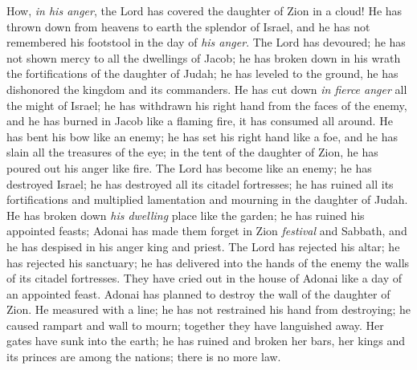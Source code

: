\begin{biblechapter} %
 How, \textit{in his anger}, 
the Lord has covered the daughter of Zion in a cloud! 
He has thrown down from heavens to earth 
the splendor of Israel, 
and he has not remembered his footstool 
in the day of \textit{his anger}.
\verse The Lord has devoured; he has not shown mercy 
to all the dwellings of Jacob; 
he has broken down in his wrath 
the fortifications of the daughter of Judah; 
he has leveled to the ground, he has dishonored 
the kingdom and its commanders.
\verse He has cut down \textit{in fierce anger} 
all the might of Israel; 
he has withdrawn his right hand 
from the faces of the enemy, 
and he has burned in Jacob like a flaming fire, 
it has consumed all around.
\verse He has bent his bow like an enemy; 
he has set his right hand 
like a foe, and he has slain 
all the treasures of the eye; 
in the tent of the daughter of Zion, 
he has poured out his anger like fire.
\verse The Lord has become like an enemy; 
he has destroyed Israel; 
he has destroyed all its citadel fortresses; 
he has ruined all its fortifications 
and multiplied lamentation and mourning 
in the daughter of Judah.
\verse He has broken down \textit{his dwelling} place like the garden; 
he has ruined his appointed feasts; 
Adonai has made them forget in Zion 
\textit{festival} and Sabbath, 
and he has despised in his anger 
king and priest.
\verse The Lord has rejected his altar; 
he has rejected his sanctuary; 
he has delivered into the hands of the enemy 
the walls of its citadel fortresses. 
They have cried out in the house of Adonai 
like a day of an appointed feast.
\verse Adonai has planned to destroy 
the wall of the daughter of Zion. 
He measured with a line; he has not restrained 
his hand from destroying; 
he caused rampart and wall to mourn; 
together they have languished away.
\verse Her gates have sunk into the earth; 
he has ruined and broken her bars, 
her kings and its princes are among the nations; 
there is no more law.
\end{biblechapter}
